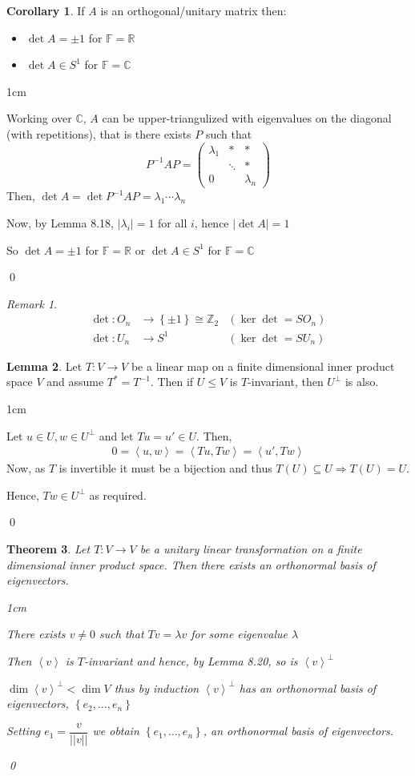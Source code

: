 \documentclass[11pt, a4paper]{report}
\makeatletter
\numberwithin{equation}{section}
\newcommand{\R}{\mathbb{R}}
\newcommand{\C}{\mathbb{C}}
\newcommand{\Z}{\mathbb{Z}}
\newcommand{\F}{\mathbb{F}}
\newcommand{\spn}[1]{\left\langle #1 \right\rangle}
\newcommand{\sett}[1]{\left\lbrace #1 \right\rbrace}
\newcommand{\pmx}[1]{\begin{pmatrix}#1\end{pmatrix}}
\numberwithin{equation}{subsection}
\theoremstyle{plain}
\newtheorem{thm}{Theorem}[chapter] %
\theoremstyle{definition}
\newtheorem{lem}[thm]{Lemma}
\newtheorem{cor}[thm]{Corollary}
\theoremstyle{remark}
\newtheorem*{rem}{Remark}
\newtheorem*{prf}{Proof}
\renewenvironment{prf}[1][\proofname]{\par
  \vspace{-\topsep}%
  \normalfont
  \topsep0pt \partopsep0pt %
  \trivlist
  \item[\hskip\labelsep
        \itshape
    #1\@addpunct{.}]\ignorespaces
}{%
  \popQED\endtrivlist\@endpefalse
  \addvspace{6pt plus 6pt} %
}
\newcommand{\pr}[1]{\begin{adjustwidth}{1cm}{} \begin{prf} #1 \end{prf} \end{adjustwidth}}
\makeatother
\begin{document}
\begin{cor}
If $A$ is an orthogonal/unitary matrix then:
\begin{itemize}
\item[] $\det A = \pm 1$ for $\F = \R$
\item[] $\det A \in S^1$ for $\F = \C$
\end{itemize}
\pr{
Working over $\C$, $A$ can be upper-triangulized with eigenvalues on the diagonal (with repetitions), that is there exists $P$ such that
$$P^{-1}AP = \pmx{\lambda_1 & * & *\\ & \ddots & * \\ 0 & & \lambda_n}$$
Then, $\det A = \det P^{-1}AP = \lambda_1 \cdots \lambda_n$

Now, by Lemma 8.18, $|\lambda_i| = 1$ for all $i$, hence $|\det A| = 1$

So $\det A = \pm 1$ for $\F = \R$ or $\det A \in S^1$ for $\F = \C$
}\qed
\end{cor}

\begin{rem}${}$
\begin{align*}
\det : O_n &\to \sett{\pm 1} \cong \Z_2 &(\ker \det = SO_n)\\
\det : U_n &\to S^1 &(\ker \det = SU_n)
\end{align*}
\end{rem}

\newpage

\begin{lem}
Let $T: V \to V$ be a linear map on a finite dimensional inner product space $V$ and assume $T^* = T^{-1}$. Then if $U \leq V$ is $T$-invariant, then $U^\perp$ is also.
\pr{
Let $u \in U, w \in U^\perp$ and let $Tu = u' \in U$. Then,
\begin{align*}
0 = \spn{u,w} = \spn{Tu,Tw} = \spn{u', Tw}
\end{align*}
Now, as $T$ is invertible it must be a bijection and thus $T(U) \subseteq U \Longrightarrow T(U) = U$.

Hence, $Tw \in U^\perp$ as required.
}\qed
\end{lem}

\begin{thm}
Let $T: V \to V$ be a unitary linear transformation on a finite dimensional inner product space. Then there exists an orthonormal basis of eigenvectors.
\pr{
There exists $v \neq 0$ such that $Tv = \lambda v$ for some eigenvalue $\lambda$

Then $\spn{v}$ is $T$-invariant and hence, by Lemma 8.20, so is $\spn{v}^\perp$

$\dim \spn{v}^\perp < \dim V$ thus by induction $\spn{v}^\perp$ has an orthonormal basis of eigenvectors, $\sett{e_2, \ldots, e_n}$

Setting $e_1 = \dfrac{v}{||v||}$ we obtain $\sett{e_1, \ldots, e_n}$, an orthonormal basis of eigenvectors.
}\qed
\end{thm}
\end{document}
